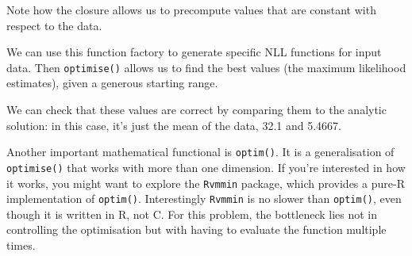 Note how the closure allows us to precompute values that are constant
with respect to the data.

We can use this function factory to generate specific NLL functions for
input data. Then \texttt{optimise()} allows us to find the best values
(the maximum likelihood estimates), given a generous starting range.

\begin{Shaded}
\begin{Highlighting}[]
\StringTok{ }\NormalTok{(}\NormalTok{, }\NormalTok{, }\NormalTok{, }\NormalTok{, }\NormalTok{, }\NormalTok{, }\NormalTok{, }\NormalTok{, }\NormalTok{, }\NormalTok{)}
\StringTok{ }\NormalTok{(}\NormalTok{, }\NormalTok{, }\NormalTok{, }\NormalTok{, }\NormalTok{, }\NormalTok{, }\NormalTok{, }\NormalTok{, }\NormalTok{, }\NormalTok{, }\NormalTok{, }\NormalTok{, }\NormalTok{, }\NormalTok{, }\NormalTok{)}
\StringTok{ }
\StringTok{ }

\NormalTok{(}\NormalTok{, }
\NormalTok{(}\NormalTok{, }
\end{Highlighting}
\end{Shaded}

We can check that these values are correct by comparing them to the
analytic solution: in this case, it's just the mean of the data, 32.1
and 5.4667.

Another important mathematical functional is \texttt{optim()}. It is a
generalisation of \texttt{optimise()} that works with more than one
dimension. If you're interested in how it works, you might want to
explore the \texttt{Rvmmin} package, which provides a pure-R
implementation of \texttt{optim()}. Interestingly \texttt{Rvmmin} is no
slower than \texttt{optim()}, even though it is written in R, not C. For
this problem, the bottleneck lies not in controlling the optimisation
but with having to evaluate the function multiple times.

